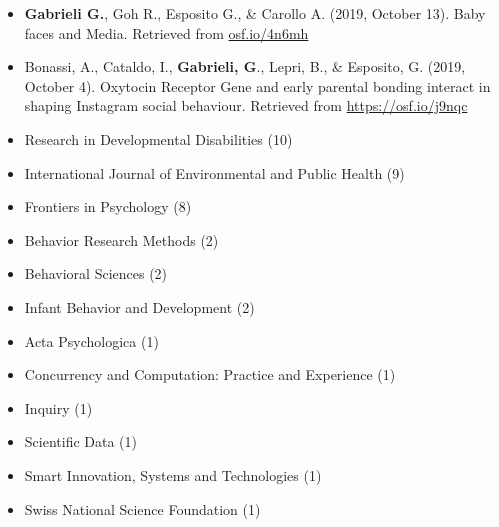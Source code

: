 \documentclass[10pt,a4paper]{altacv}
\begin{document}
\begin{fullwidth}
\begin{itemize}
			\item \textbf{Gabrieli G.}, Goh R., Esposito G., \& Carollo A. (2019, October 13). Baby faces and Media. Retrieved from \href{https://osf.io/4n6mh}{osf.io/4n6mh} 
			
			\item Bonassi, A., Cataldo, I., \textbf{Gabrieli, G}., Lepri, B., \& Esposito, G. (2019, October 4). Oxytocin Receptor Gene and early parental bonding interact in shaping Instagram social behaviour. Retrieved from \href{https://osf.io/j9nqc}{https://osf.io/j9nqc} 
			
		\end{itemize}
		
		\begin{itemize}
			\item Research in Developmental Disabilities (10)
			\item International Journal of Environmental and Public Health (9)
			\item Frontiers in Psychology (8)
			\item Behavior Research Methods (2)
			\item Behavioral Sciences (2)
			\item Infant Behavior and Development (2)
			\item Acta Psychologica (1)
			\item Concurrency and Computation: Practice and Experience (1)
			\item Inquiry (1)
			\item Scientific Data (1)
			\item Smart Innovation, Systems and Technologies (1)
			\item Swiss National Science Foundation (1)
		\end{itemize}
		
		
		

\end{fullwidth}
\end{document}
